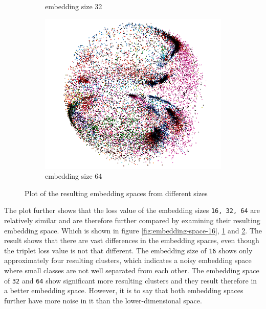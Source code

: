 \begin{figure}[t]
\begin{subfigure}{.33\linewidth}
  \caption{embedding size 32}
  \label{fig:embedding-space-32}
\end{subfigure}%
\begin{subfigure}{.33\linewidth}
  \centering
  \includegraphics[width=.9\linewidth]{study-doc/experiment_embedding_size/assets/embedding_space_64.png}
  \caption{embedding size 64}
  \label{fig:embedding-space-64}
\end{subfigure}
\caption{Plot of the resulting embedding spaces from different sizes}
\label{fig:embedding-size-experiment-embedding-space}
\end{figure}
\newline
\newline
\noindent
The plot further shows that the loss value of the embedding sizes \texttt{16, 32, 64} are relatively similar and are therefore further compared by examining their resulting embedding space. Which is shown in figure \ref{fig:embedding-space-16}, \ref{fig:embedding-space-32} and \ref{fig:embedding-space-64}. The result shows that there are vast differences in the embedding spaces, even though the triplet loss value is not that different. The embedding size of \texttt{16} shows only approximately four resulting clusters, which indicates a noisy embedding space where small classes are not well separated from each other. The embedding space of \texttt{32} and \texttt{64} show significant more resulting clusters and they result therefore in a better embedding space. However, it is to say that both embedding spaces further have more noise in it than the lower-dimensional space.
\newline
